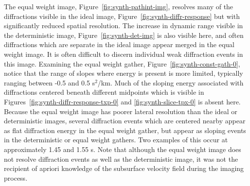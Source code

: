 The equal weight image, Figure~\ref{fig:synth-pathint-img}, resolves many of the diffractions visible in the ideal image, Figure~\ref{fig:synth-diffr-response} but with significantly reduced spatial resolution.  The increase in dynamic range visible in the deterministic image, Figure~\ref{fig:synth-det-img} is also visible here, and often diffractions which are separate in the ideal image appear merged in the equal weight image.  It is often difficult to discern individual weak diffraction events in this image.  Examining the equal weight gather, Figure~\ref{fig:synth-const-gath-0}, notice that the range of slopes where energy is present is more limited, typically ranging between -0.5 and 0.5 s$^2$/km.  Much of the sloping energy associated with diffractions centered beneath different midpoints which is visible in Figures~\ref{fig:synth-diffr-response-txp-0} and \ref{fig:synth-slice-tpx-0} is absent here.  Because the equal weight image has poorer lateral resolution than the ideal or deterministic images, several diffraction events which are centered nearby appear as flat diffraction energy in the equal weight gather, but appear as sloping events in the deterministic or equal weight gathers.  Two examples of this occur at approximately 1.45 and 1.55 s.  Note that although the equal weight image does not resolve diffraction events as well as the deterministic image, it was not the recipient of apriori knowledge of the subsurface velocity field during the imaging process.



